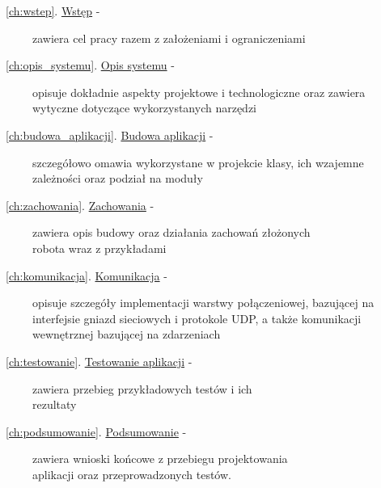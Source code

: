 \begin{description}
  \item[ {~\ref{ch:wstep}. \hyperref[ch:wstep]{Wstęp} -} ]zawiera cel pracy razem z założeniami i ograniczeniami
  \item[ {~\ref{ch:opis_systemu}. \hyperref[ch:opis_systemu]{Opis systemu} -} ]opisuje dokładnie aspekty projektowe i technologiczne oraz zawiera wytyczne dotyczące wykorzystanych narzędzi
  \item[ {~\ref{ch:budowa_aplikacji}. \hyperref[ch:budowa_aplikacji]{Budowa aplikacji} -} ]szczegółowo omawia wykorzystane w projekcie klasy, ich wzajemne zależności oraz podział na moduły
  \item[ {~\ref{ch:zachowania}. \hyperref[ch:zachowania]{Zachowania} -} ]zawiera opis budowy oraz działania zachowań złożonych\\robota wraz z przykładami
  \item[ {~\ref{ch:komunikacja}. \hyperref[ch:komunikacja]{Komunikacja} -} ]opisuje szczegóły implementacji warstwy połączeniowej, bazującej na interfejsie gniazd sieciowych i protokole UDP, a także komunikacji wewnętrznej bazującej na zdarzeniach
  \item[ {~\ref{ch:testowanie}. \hyperref[ch:testowanie]{Testowanie aplikacji} -} ]zawiera przebieg przykładowych testów i ich\\rezultaty
  \item[ {~\ref{ch:podsumowanie}. \hyperref[ch:podsumowanie]{Podsumowanie} -} ]zawiera wnioski końcowe z przebiegu projektowania\\aplikacji oraz przeprowadzonych testów.
\end{description}
